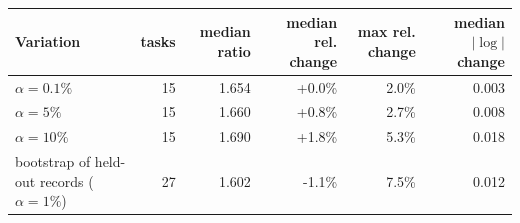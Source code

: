 \begin{center}\small\begin{tabular}{lrrrrr}\toprule
Variation & tasks & median ratio & median rel. change & max rel. change & median $|\log|$ change \\
\midrule
$\alpha=0.1\%$ & 15 & 1.654 & +0.0\% & 2.0\% & 0.003 \\
$\alpha=5\%$ & 15 & 1.660 & +0.8\% & 2.7\% & 0.008 \\
$\alpha=10\%$ & 15 & 1.690 & +1.8\% & 5.3\% & 0.018 \\
bootstrap of held-out records ($\alpha=1\%$) & 27 & 1.602 & -1.1\% & 7.5\% & 0.012 \\
\bottomrule\end{tabular}\end{center}
